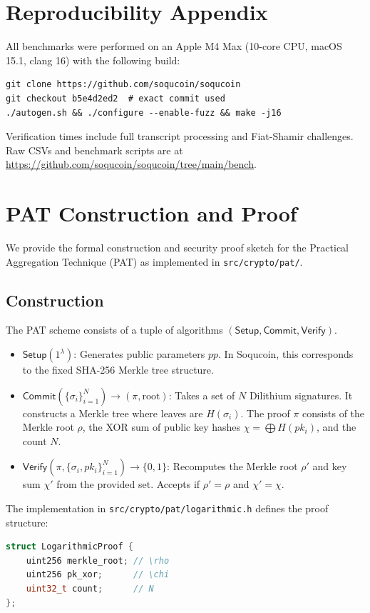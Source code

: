 \documentclass[10pt]{article}
\begin{document}
\appendix

\section{Reproducibility Appendix}
All benchmarks were performed on an Apple M4 Max (10-core CPU, macOS 15.1, clang 16) with the following build:
\begin{lstlisting}
git clone https://github.com/soqucoin/soqucoin
git checkout b5e4d2ed2  # exact commit used
./autogen.sh && ./configure --enable-fuzz && make -j16
\end{lstlisting}
Verification times include full transcript processing and Fiat-Shamir challenges. Raw CSVs and benchmark scripts are at \url{https://github.com/soqucoin/soqucoin/tree/main/bench}.

\section{PAT Construction and Proof}
\label{app:pat}

We provide the formal construction and security proof sketch for the Practical Aggregation Technique (PAT) as implemented in \texttt{src/crypto/pat/}.

\subsection{Construction}
The PAT scheme consists of a tuple of algorithms $(\mathsf{Setup}, \mathsf{Commit}, \mathsf{Verify})$.

\begin{itemize}
    \item $\mathsf{Setup}(1^\lambda)$: Generates public parameters $pp$. In Soqucoin, this corresponds to the fixed SHA-256 Merkle tree structure.
    \item $\mathsf{Commit}(\{\sigma_i\}_{i=1}^N) \to (\pi, \text{root})$:
    Takes a set of $N$ Dilithium signatures. It constructs a Merkle tree where leaves are $H(\sigma_i)$. The proof $\pi$ consists of the Merkle root $\rho$, the XOR sum of public key hashes $\chi = \bigoplus H(pk_i)$, and the count $N$.
    \item $\mathsf{Verify}(\pi, \{\sigma_i, pk_i\}_{i=1}^N) \to \{0,1\}$:
    Recomputes the Merkle root $\rho'$ and key sum $\chi'$ from the provided set. Accepts if $\rho' = \rho$ and $\chi' = \chi$.
\end{itemize}

The implementation in \texttt{src/crypto/pat/logarithmic.h} defines the proof structure:
\begin{lstlisting}[language=C++]
struct LogarithmicProof {
    uint256 merkle_root; // \rho
    uint256 pk_xor;      // \chi
    uint32_t count;      // N
};
\end{lstlisting}
\end{document}
